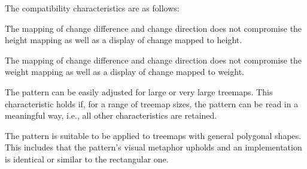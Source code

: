 \documentclass[smallextended,natbib]{svjour3}       %
\begin{document}
The compatibility characteristics are as follows:
\begin{description}[itemindent=0mm,labelwidth=0mm,leftmargin=\maxlabel,align=right,itemsep=1mm]
    \item [$\nabla_{\textrm{IndHeight}}$]
        The mapping of change difference and change direction does not compromise the height mapping as well as a display of change mapped to height.
    \item [$\nabla_{\textrm{IndWeight}}$]
        The mapping of change difference and change direction does not compromise the weight mapping as well as a display of change mapped to weight.
    \item [$\nabla_{\textrm{TreeSize}}$]
        The pattern can be easily adjusted for large or very large treemaps.
        This characteristic holds if, for a range of treemap sizes, the pattern can be read in a meaningful way, i.e., all other characteristics are retained.
    \item [$\nabla_{\textrm{Polygonal}}$]
        The pattern is suitable to be applied to treemaps with general polygonal shapes.
        This includes that the pattern's visual metaphor upholds and an implementation is identical or similar to the rectangular one.
\end{description}
\end{document}
